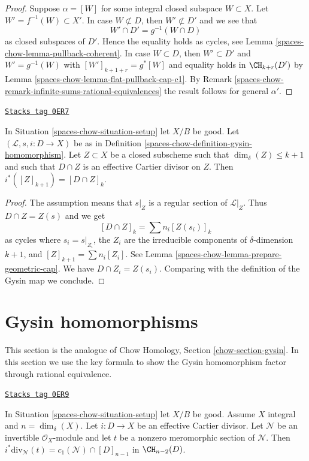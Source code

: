 \begin{proof}
Suppose $\alpha = [W]$ for some integral closed subspace
$W \subset X$. Let $W' = f^{-1}(W) \subset X'$. In case $W \not \subset D$,
then $W' \not \subset D'$ and we see that
$$
W' \cap D' = g^{-1}(W \cap D)
$$
as closed subspaces of $D'$. Hence the
equality holds as cycles, see Lemma \ref{spaces-chow-lemma-pullback-coherent}.
In case $W \subset D$, then $W' \subset D'$ and $W' = g^{-1}(W)$
with $[W']_{k + 1 + r} = g^*[W]$ and equality holds in
$\CH_{k + r}(D')$ by Lemma \ref{spaces-chow-lemma-flat-pullback-cap-c1}.
By Remark \ref{spaces-chow-remark-infinite-sums-rational-equivalences}
the result follows for general $\alpha'$.
\end{proof}

\begin{lemma}
\label{spaces-chow-lemma-easy-gysin}
\href{https://stacks.math.columbia.edu/tag/0ER7}{\texttt{Stacks tag 0ER7}}

In Situation \ref{spaces-chow-situation-setup} let $X/B$ be good.
Let $(\mathcal{L}, s, i : D \to X)$ be as in
Definition \ref{spaces-chow-definition-gysin-homomorphism}.
Let $Z \subset X$ be a closed subscheme such
that $\dim_\delta(Z) \leq k + 1$ and such that
$D \cap Z$ is an effective Cartier divisor on $Z$. Then
$i^*([Z]_{k + 1}) = [D \cap Z]_k$.
\end{lemma}

\begin{proof}
The assumption means that $s|_Z$ is a regular section of $\mathcal{L}|_Z$.
Thus $D \cap Z = Z(s)$ and we get
$$
[D \cap Z]_k = \sum n_i [Z(s_i)]_k
$$
as cycles where $s_i = s|_{Z_i}$, the $Z_i$ are the irreducible components
of $\delta$-dimension $k + 1$, and $[Z]_{k + 1} = \sum n_i[Z_i]$.
See Lemma \ref{spaces-chow-lemma-prepare-geometric-cap}.
We have $D \cap Z_i = Z(s_i)$. Comparing with the definition
of the Gysin map we conclude.
\end{proof}

\section{Gysin homomorphisms}
\label{spaces-chow-section-gysin}
This section is the analogue of
Chow Homology, Section \ref{chow-section-gysin}.
In this section we use the key formula to show the Gysin homomorphism
factor through rational equivalence.

\begin{lemma}
\label{spaces-chow-lemma-gysin-factors-general}
\href{https://stacks.math.columbia.edu/tag/0ER9}{\texttt{Stacks tag 0ER9}}

In Situation \ref{spaces-chow-situation-setup} let $X/B$ be good.
Assume $X$ integral and $n = \dim_\delta(X)$.
Let $i : D \to X$ be an effective Cartier divisor.
Let $\mathcal{N}$ be an invertible $\mathcal{O}_X$-module
and let $t$ be a nonzero meromorphic section of $\mathcal{N}$.
Then $i^*\text{div}_\mathcal{N}(t) = c_1(\mathcal{N}) \cap [D]_{n - 1}$
in $\CH_{n - 2}(D)$.
\end{lemma}

